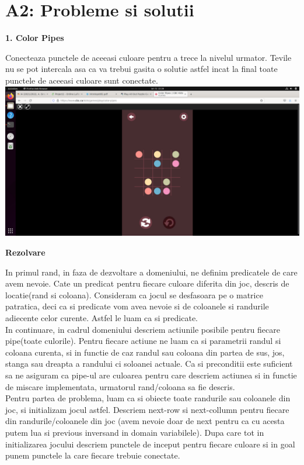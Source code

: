 \documentclass[a4paper,12pt]{report}
\begin{document}
\chapter{A2: Probleme si solutii}
\begin{Large}
 \textbf{       1. Color Pipes}\\
\end{Large}
Conecteaza punctele de aceeasi culoare pentru a trece la nivelul urmator. Tevile nu se pot intercala asa ca va trebui gasita o solutie astfel incat la final toate punctele de aceeasi culoare sunt conectate.\\

\includegraphics[width=150mm,scale=0.5]{pipes.png}\\
\begin{Large}
 \textbf{Rezolvare}\\
\end{Large}
In primul rand, in faza de dezvoltare a domeniului, ne definim predicatele de care avem nevoie. Cate un predicat pentru fiecare culoare diferita din joc, descris de locatie(rand si coloana). Consideram ca jocul se desfasoara pe o matrice patratica, deci ca si predicate vom avea nevoie si de coloanele si randurile adiecente celor curente. Astfel le luam ca si predicate.\\
In continuare, in cadrul domeniului descriem actiunile posibile pentru fiecare pipe(toate culorile). Pentru fiecare actiune ne luam ca si parametrii randul si coloana curenta, si in functie de caz randul sau coloana din partea de sus, jos, stanga sau dreapta a randului ci soloanei actuale. Ca si preconditii este suficient sa ne asiguram ca pipe-ul are culoarea pentru care descriem actiunea si in functie de miscare implementata, urmatorul rand/coloana sa fie descris.\\
Pentru partea de problema, luam ca si obiecte toate randurile sau coloanele din joc, si initializam jocul astfel. Descriem next-row si next-collumn pentru fiecare din randurile/coloanele din joc (avem nevoie doar de next pentru ca cu acesta putem lua si previous inversand in domain variabilele). Dupa care tot in initializarea jocului descriem punctele de inceput pentru fiecare culoare si in goal punem punctele la care fiecare trebuie conectate.\\
\\
\end{document}
